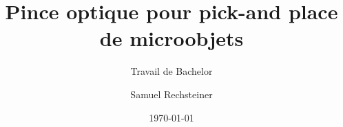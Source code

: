 \author{Samuel Rechsteiner}


\title{Pince optique pour pick-and place de microobjets}

\subtitle{Travail de Bachelor}


\date{\today}


